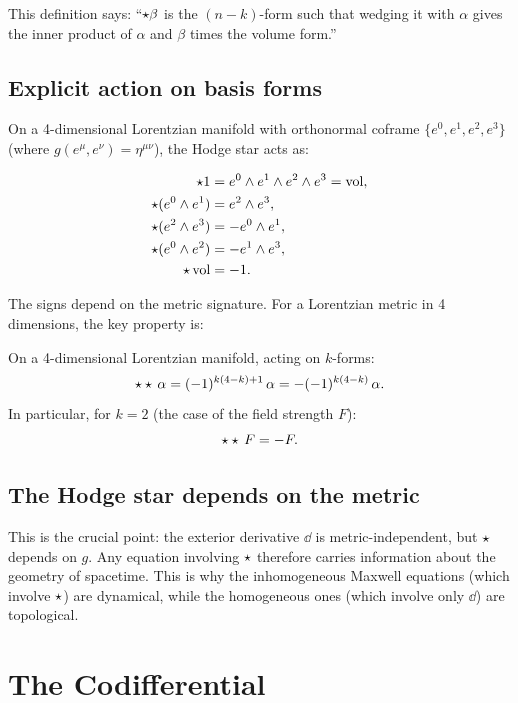 This definition says: ``$\star\beta$ is the $(n{-}k)$-form such that wedging it with $\alpha$ gives the inner product of $\alpha$ and $\beta$ times the volume form.''

\subsection{Explicit action on basis forms}

On a 4-dimensional Lorentzian manifold with orthonormal coframe $\{e^0, e^1, e^2, e^3\}$ (where $g(e^\mu, e^\nu) = \eta^{\mu\nu}$), the Hodge star acts as:

\begin{align}
\star 1 &= e^0 \wedge e^1 \wedge e^2 \wedge e^3 = \operatorname{vol}, \\
\star(e^0 \wedge e^1) &= e^2 \wedge e^3, \\
\star(e^2 \wedge e^3) &= -e^0 \wedge e^1, \\
\star(e^0 \wedge e^2) &= -e^1 \wedge e^3, \\
\star\operatorname{vol} &= -1.
\end{align}

The signs depend on the metric signature. For a Lorentzian metric in 4 dimensions, the key property is:

\begin{proposition}
On a 4-dimensional Lorentzian manifold, acting on $k$-forms:
\begin{equation}
\star\star\,\alpha = (-1)^{k(4-k)+1}\,\alpha = -(-1)^{k(4-k)}\,\alpha.
\end{equation}
In particular, for $k = 2$ (the case of the field strength $F$):
\begin{equation}
\star\star\,F = -F.
\end{equation}
\end{proposition}

\subsection{The Hodge star depends on the metric}

This is the crucial point: the exterior derivative $\dd$ is metric-independent, but $\star$ depends on $g$. Any equation involving $\star$ therefore carries information about the geometry of spacetime. This is why the inhomogeneous Maxwell equations (which involve $\star$) are dynamical, while the homogeneous ones (which involve only $\dd$) are topological.

\section{The Codifferential}

